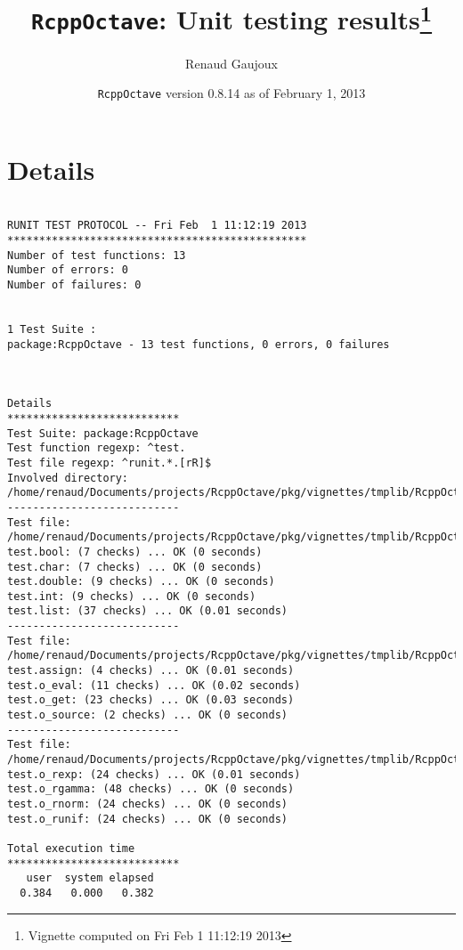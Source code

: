 \documentclass[10pt]{article}
\author{Renaud Gaujoux}
\title{\texttt{RcppOctave}: Unit testing results\footnote{Vignette computed  on Fri Feb  1 11:12:19 2013}}
\date{\texttt{RcppOctave} version 0.8.14 as of February  1, 2013}
\begin{document}
\maketitle

\section{Details}
\begin{verbatim}

RUNIT TEST PROTOCOL -- Fri Feb  1 11:12:19 2013 
*********************************************** 
Number of test functions: 13 
Number of errors: 0 
Number of failures: 0 

 
1 Test Suite : 
package:RcppOctave - 13 test functions, 0 errors, 0 failures



Details 
*************************** 
Test Suite: package:RcppOctave 
Test function regexp: ^test. 
Test file regexp: ^runit.*.[rR]$ 
Involved directory: 
/home/renaud/Documents/projects/RcppOctave/pkg/vignettes/tmplib/RcppOctave/unitTests 
--------------------------- 
Test file: /home/renaud/Documents/projects/RcppOctave/pkg/vignettes/tmplib/RcppOctave/unitTests/runit.conversions.R 
test.bool: (7 checks) ... OK (0 seconds)
test.char: (7 checks) ... OK (0 seconds)
test.double: (9 checks) ... OK (0 seconds)
test.int: (9 checks) ... OK (0 seconds)
test.list: (37 checks) ... OK (0.01 seconds)
--------------------------- 
Test file: /home/renaud/Documents/projects/RcppOctave/pkg/vignettes/tmplib/RcppOctave/unitTests/runit.eval.R 
test.assign: (4 checks) ... OK (0.01 seconds)
test.o_eval: (11 checks) ... OK (0.02 seconds)
test.o_get: (23 checks) ... OK (0.03 seconds)
test.o_source: (2 checks) ... OK (0 seconds)
--------------------------- 
Test file: /home/renaud/Documents/projects/RcppOctave/pkg/vignettes/tmplib/RcppOctave/unitTests/runit.stats.R 
test.o_rexp: (24 checks) ... OK (0.01 seconds)
test.o_rgamma: (48 checks) ... OK (0 seconds)
test.o_rnorm: (24 checks) ... OK (0 seconds)
test.o_runif: (24 checks) ... OK (0 seconds)

Total execution time
***************************
   user  system elapsed 
  0.384   0.000   0.382 

\end{verbatim}
\end{document}
